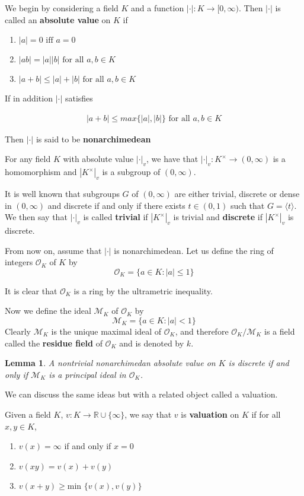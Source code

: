 \documentclass[12pt]{amsart}
\newtheorem{lem}[thm]{Lemma}
\theoremstyle{definition}
\theoremstyle{remark}
\theoremstyle{definition}
\newcommand{\MCM}{\mathcal{M}}
\newcommand{\MCO}{\mathcal{O}}
\begin{document}
We begin by considering a field $K$ and a function $|\cdot|: K \to [0,\infty)$. Then $|\cdot|$ is called an \textbf{absolute value} on $K$ if 

\begin{enumerate}
\item  $|a| = 0 \text{ iff } a = 0 $
\item $|ab| = |a||b| \text{ for all } a,b \in K$
\item $ |a+b| \leq |a|+|b| \text{ for all } a,b \in K$
\end{enumerate}
If in addition $|\cdot|$ satisfies 

\begin{align*}
|a+b| \leq max\{|a|,|b|\} \text{ for all } a,b \in K
\end{align*}

\noindent Then $|\cdot|$ is said to be \textbf{nonarchimedean}


For any field $K$ with absolute value $|\cdot |_v$, we have that $| \cdot |_v:K^{\times}\rightarrow (0 , \infty)$ is a homomorphism and $|K^{\times}|_v$ is a subgroup of $(0, \infty)$. 

It is well known that subgroups $G$ of $(0, \infty)$ are either trivial, discrete or dense in $(0,\infty)$ and discrete if and only if there exists $t \in (0,1)$ such that $G=\langle t \rangle$. We then say that $|\cdot|_v$ is called \textbf{trivial} if $|K^{\times}|_v$ is trivial and \textbf{discrete} if $|K^{\times}|_v$ is discrete.

From now on, assume that $|\cdot|$ is nonarchimedean. Let us define the ring of integers $\MCO_K$ of $K$ by 
$$\MCO_K=\{a \in K : |a| \leq 1\}$$ 

\noindent It is clear that $\MCO_K$ is a ring by the ultrametric inequality. 

\noindent Now we define the ideal $\MCM_K$ of $\MCO_K$ by
$$\MCM_K=\{a \in K : |a|< 1\}$$
Clearly $\MCM_K$ is the unique maximal ideal of $\MCO_K$, and therefore $\MCO_K/\MCM_K$ is a field called the \textbf{residue field} of $\MCO_K$ and is denoted by $k$.  

\begin{lem}
A nontrivial nonarchimedan absolute value on $K$ is discrete if and only if $\MCM_K$ is a principal ideal in $\MCO_K$. 
\end{lem}

We can discuss the same ideas but with a related object called a valuation. 

Given a field $K$, $v: K \rightarrow \mathbb{R} \cup \{\infty\}$, we say that $v$ is \textbf{valuation} on $K$ if for all $x,y \in K$, 
\begin{enumerate}
\item $v(x)=\infty$ if and only if $x=0$
\item $v(xy)=v(x)+v(y)$
\item $v(x+y)\geq \text{min } \{v(x),v(y)\}$
\end{enumerate}
\end{document}
